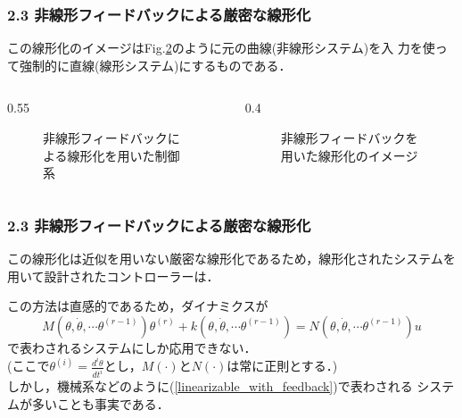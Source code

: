 \begin{frame}[t]
\frametitle{2.3 非線形フィードバックによる厳密な線形化}
この線形化のイメージはFig.\ref{image_lin_w_fb}のように元の曲線(非線形システム)を入
力を使って強制的に直線(線形システム)にするものである．
\vspace{-5mm}
\begin{columns}[t]
\begin{column}{0.55\textwidth}
\begin{figure}[htbp]
 \begin{center}
	\scalebox{.6}{ 
  	
  }
  \caption{非線形フィードバックによる線形化を用いた制御系}
  \label{config_nonlinear_feedback}
 \end{center}
\end{figure}
\end{column}
\begin{column}{0.4\textwidth}
\vspace{10mm}
\begin{figure}[htbp]
 \begin{center}
  \caption{非線形フィードバックを用いた線形化のイメージ}
  \label{image_lin_w_fb}
 \end{center}
\end{figure}
\end{column}
\end{columns}
\end{frame}

\begin{frame}[t]
\frametitle{2.3 非線形フィードバックによる厳密な線形化}
この線形化は近似を用いない厳密な線形化であるため，線形化されたシステムを
用いて設計されたコントローラーは．

この方法は直感的であるため，ダイナミクスが
\begin{equation}
 M(\theta,\dot{\theta}, \cdots \theta^{(r-1)}) \theta^{(r)} 
  + k(\theta,\dot{\theta}, \cdots \theta^{(r-1)}) 
  = N(\theta,\dot{\theta}, \cdots \theta^{(r-1)}) u
  \label{linearizable_with_feedback}
\end{equation}
で表わされるシステムにしか応用できない．\\
(ここで$\theta^{(i)} =\frac{d^{i} \theta}{dt^i}$とし，$M(\cdot)$と$N(\cdot)$は常に正則とする．)\\
しかし，機械系などのように(\ref{linearizable_with_feedback})で表わされる
システムが多いことも事実である．
\end{frame}

